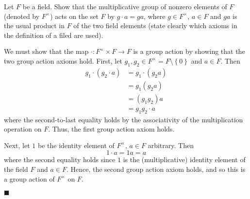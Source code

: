 \documentclass[12pt]{article}
\renewcommand{\qed}{\hfill$\blacksquare$}
\renewenvironment{proof}{\begin{addmargin}[1em]{0em}\begin{newproof}}{\end{newproof}\end{addmargin}\qed}
\newenvironment{problem}[2][Exercise]{\begin{trivlist}
\item[\hskip \labelsep {\bfseries #1}\hskip \labelsep {\bfseries #2.}]}{\end{trivlist}}
\begin{document}
\begin{problem}{1.7.1}
Let $F$ be a field. Show that the multiplicative group of nonzero elements of $F$ (denoted by $F^{\times}$) acts on the set $F$ by $g\cdot a=ga$, where $g\in F^{\times}$, $a\in F$ and $ga$ is the usual product in $F$ of the two field elements (state clearly which axioms in the definition of a filed are used).
\end{problem}
\begin{proof}
We must show that the map $\cdot: F^{\times} \times F \rightarrow F$ is a group action by showing that the two group action axioms hold. First, let $g_1,g_2 \in F^{\times}=F\setminus \left\{0\right\}$ and $a\in F$. Then 
\begin{equation}
	\begin{split}
		g_1 \cdot \left(g_2\cdot a\right) & = g_1 \cdot \left(g_2a\right) \\
		& = g_1\left(g_2a\right) \\
		& = \left(g_1 g_2\right)a \\
		& = g_1g_2 \cdot a
	\end{split}
\end{equation}
where the second-to-last equality holds by the associativity of the multiplication operation on $F$. Thus, the first group action axiom holds.

Next, let $1$ be the identity element of $F^{\times}$, $a\in F$ arbitrary. Then
\begin{equation}
1 \cdot a = 1a = a
\end{equation}
where the second equality holds since $1$ is the (multiplicative) identity element of the field $F$ and $a\in F$. Hence, the second group action axiom holds, and so this is a group action of $F^{\times}$ on $F$.
\end{proof}
\end{document}
